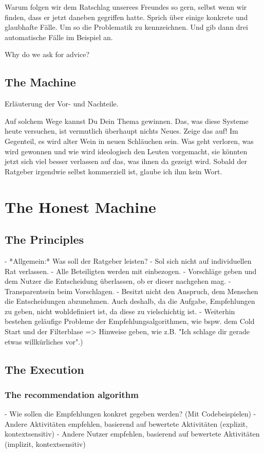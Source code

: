 \documentclass[12pt,numbers=noenddot,parskip,bibliography=totocnumbered,listof=totocnumbered]{scrreprt}
\begin{document}
Warum folgen wir dem Ratschlag unserees Freundes so gern, selbst wenn wir finden, dass er jetzt daneben gegriffen hatte. Sprich über einige konkrete und glaubhafte Fälle. Um so die Problematik zu kennzeichnen. Und gib dann drei automatische Fälle im Beispiel an.


Why do we ask for advice?


\section{The Machine}
Erläuterung der Vor- und Nachteile.

Auf solchem Wege kannst Du Dein Thema gewinnen. Das, was diese Systeme heute versuchen, ist vermutlich überhaupt nichts Neues. Zeige das auf! Im Gegenteil, es wird alter Wein in neuen Schläuchen sein. Was geht verloren, was wird gewonnen und wie wird ideologisch den Leuten vorgemacht, sie könnten jetzt sich viel besser verlassen auf das, was ihnen da gezeigt wird.  Sobald der Ratgeber irgendwie selbst kommerziell ist, glaube ich ihm kein Wort.

\chapter{The Honest Machine}

\section{The Principles}

- *Allgemein:* Was soll der Ratgeber leisten? 
- Sol sich nicht auf individuellen Rat verlassen.
- Alle Beteiligten werden mit einbezogen.
- Vorschläge geben und dem Nutzer die Entscheidung überlassen, ob er dieser nachgehen mag.
- Transparentsein beim Vorschlagen.
- Besitzt nicht den Anspruch, dem Menschen die Entscheidungen abzunehmen. Auch deshalb, da die Aufgabe, Empfehlungen zu geben, nicht wohldefiniert ist, da diese zu vielschichtig ist.
- Weiterhin bestehen geläufige Probleme der Empfehlungsalgorithmen, wie bspw. dem Cold Start und der Filterblase => Hinweise geben, wie z.B. "Ich schlage dir gerade etwas willkürliches vor".)
\section{The Execution}
\subsection{The recommendation algorithm}
- Wie sollen die Empfehlungen konkret gegeben werden? (Mit Codebeispielen)
	- Andere Aktivitäten empfehlen, basierend auf bewertete Aktivitäten (explizit, kontextsensitiv)
	- Andere Nutzer empfehlen, basierend auf bewertete Aktivitäten (implizit, kontextsensitiv)
\end{document}
